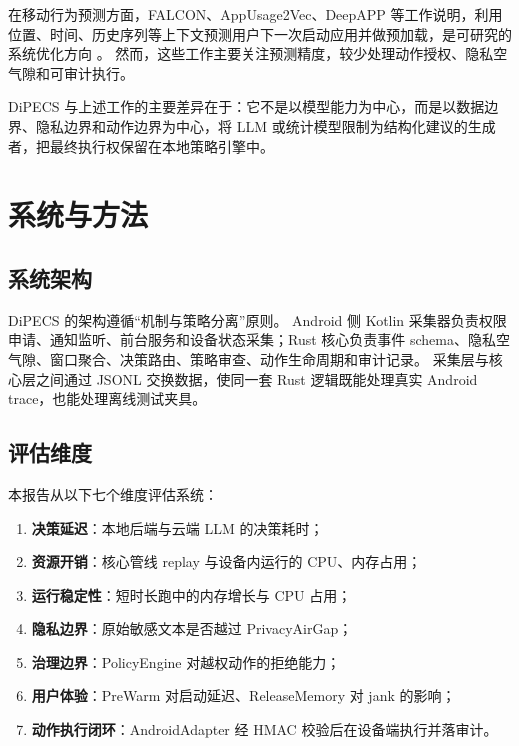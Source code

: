 \documentclass[12pt,a4paper]{article}
\begin{document}
在移动行为预测方面，FALCON、AppUsage2Vec、DeepAPP 等工作说明，利用位置、时间、历史序列等上下文预测用户下一次启动应用并做预加载，是可研究的系统优化方向 \cite{falcon,appusage2vec,deepapp}。
然而，这些工作主要关注预测精度，较少处理动作授权、隐私空气隙和可审计执行。

DiPECS 与上述工作的主要差异在于：它不是以模型能力为中心，而是以数据边界、隐私边界和动作边界为中心，将 LLM 或统计模型限制为结构化建议的生成者，把最终执行权保留在本地策略引擎中。

\section{系统与方法}\label{sec:method}

\subsection{系统架构}\label{subsec:architecture}

DiPECS 的架构遵循``机制与策略分离''原则。
Android 侧 Kotlin 采集器负责权限申请、通知监听、前台服务和设备状态采集；Rust 核心负责事件 schema、隐私空气隙、窗口聚合、决策路由、策略审查、动作生命周期和审计记录。
采集层与核心层之间通过 JSONL 交换数据，使同一套 Rust 逻辑既能处理真实 Android trace，也能处理离线测试夹具。

\subsection{评估维度}\label{subsec:dimensions}

本报告从以下七个维度评估系统：

\begin{enumerate}[label=(\arabic*)]
  \item \textbf{决策延迟}：本地后端与云端 LLM 的决策耗时；
  \item \textbf{资源开销}：核心管线 replay 与设备内运行的 CPU、内存占用；
  \item \textbf{运行稳定性}：短时长跑中的内存增长与 CPU 占用；
  \item \textbf{隐私边界}：原始敏感文本是否越过 PrivacyAirGap；
  \item \textbf{治理边界}：PolicyEngine 对越权动作的拒绝能力；
  \item \textbf{用户体验}：PreWarm 对启动延迟、ReleaseMemory 对 jank 的影响；
  \item \textbf{动作执行闭环}：AndroidAdapter 经 HMAC 校验后在设备端执行并落审计。
\end{enumerate}
\end{document}
